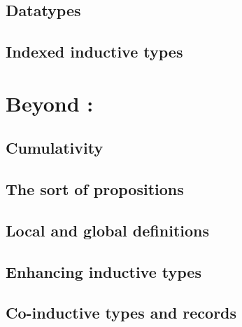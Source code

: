 \subsection{Datatypes}

\subsection{Indexed inductive types}

\section{Beyond : }

\subsection{Cumulativity}

\subsection{The sort of propositions}

\subsection{Local and global definitions}

\subsection{Enhancing inductive types}

\subsection{Co-inductive types and records}